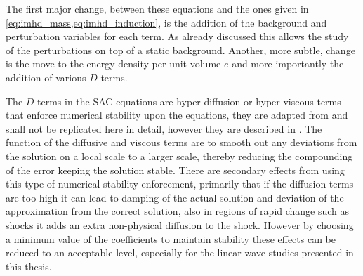 The first major change, between these equations and the ones given in \cref{eq:imhd_mass,eq:imhd_induction}, is the addition of the background and perturbation variables for each term.
As already discussed this allows the study of the perturbations on top of a static background.
Another, more subtle, change is the move to the energy density per-unit volume $e$ and more importantly the addition of various $D$ terms.

The $D$ terms in the SAC equations are hyper-diffusion or hyper-viscous terms that enforce numerical stability upon the equations, they are adapted from \citep{nordlund1995} and shall not be replicated here in detail, however they are described in \citet{shelyag2008}.
The function of the diffusive and viscous terms are to smooth out any deviations from the solution on a local scale to a larger scale, thereby reducing the compounding of the error keeping the solution stable.
There are secondary effects from using this type of numerical stability enforcement, primarily that if the diffusion terms are too high it can lead to damping of the actual solution and deviation of the approximation from the correct solution, also in regions of rapid change such as shocks it adds an extra non-physical diffusion to the shock.
However by choosing a minimum value of the coefficients to maintain stability these effects can be reduced to an acceptable level, especially for the linear wave studies presented in this thesis.

